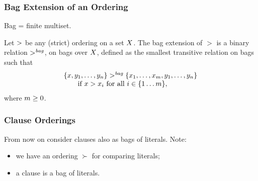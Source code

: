                        \begin{frame}
\frametitle{Bag Extension of an Ordering}

\alert{Bag = finite multiset}.

Let ${>}$ be any (strict) ordering on a set ${X}$. 
The \alert{bag extension of $>$} is a binary relation \alert{$>^{\mathit{bag}}$}, 
on bags over ${X}$, defined as the smallest transitive relation on 
bags such that
  \[
  \begin{array}{l}
    {\{x,{y_{1},\ldots,y_{n}}\}} >^{\mathit{bag}}
    {\{{x_{1},\ldots,x_{m}},{y_{1},\ldots,y_{n}}\}} \\
    \qquad \text{if } x > x_i \text{ for all } i\in\{1\ldots m\},
    \end{array}
  \]
where ${m \geq 0}$. 



                                \end{frame}


                        \begin{frame}\frametitle{Clause Orderings}

From now on consider clauses also as \alert{bags of literals}. Note:

\begin{itemize}
\item we have an ordering $\succ$ for comparing literals;
\item a clause is a bag of literals.
\end{itemize}



                                \end{frame}

